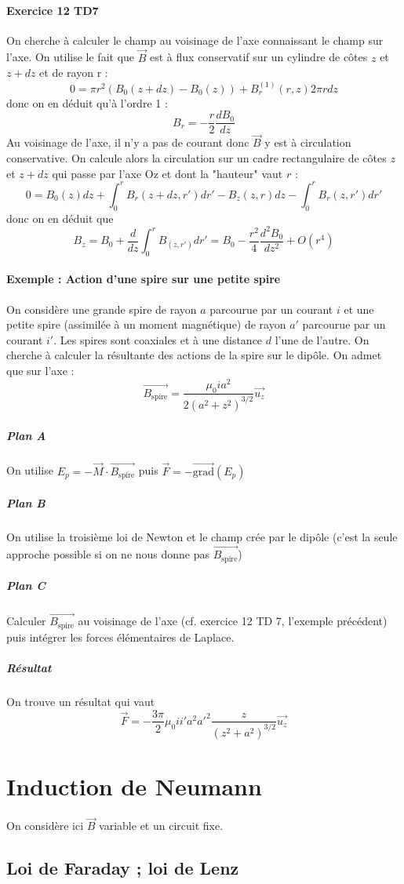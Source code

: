 \documentclass[french]{book}
\theoremstyle{plain}
\theoremstyle{definition}
\theoremstyle{remark}
\newcommand{\grad}{\overrightarrow{\text{grad}}}
\begin{document}
\paragraph{Exercice 12 TD7} On cherche à calculer le champ au voisinage de l'axe connaissant le champ sur l'axe. On utilise le fait que $\overrightarrow{B}$ est à flux conservatif sur un cylindre de côtes $z$ et $z+dz$ et de rayon r : $$0=\pi r^2\left(B_0(z+dz)-B_0(z)\right)+B_r^{(1)}(r,z)2\pi r dz$$ donc on en déduit qu'à l'ordre 1 : $$B_r=-\frac{r}{2}\frac{dB_0}{dz}$$ Au voisinage de l'axe, il n'y a pas de courant donc $\overrightarrow{B}$ y est à circulation conservative. On calcule alors la circulation sur un cadre rectangulaire de côtes $z$ et $z+dz$ qui passe par l'axe Oz et dont la "hauteur" vaut $r$ : $$0=B_0(z)dz+\int_{0}^{r}B_r(z+dz,r')dr'-B_z(z,r)dz-\int_{0}^{r}B_r(z,r')dr'$$ donc on en déduit que $$B_z=B_0+\frac{d}{dz}\int_{0}^{r}B_(z,r')dr'=B_0-\frac{r^2}{4}\frac{d^2B_0}{dz^2}+O(r^4)$$
\paragraph{Exemple : Action d'une spire sur une petite spire}On considère une grande spire de rayon $a$ parcourue par un courant $i$ et une petite spire (assimilée à un moment magnétique) de rayon $a'$ parcourue par un courant $i'$. Les spires sont coaxiales et à une distance $d$ l'une de l'autre. On cherche à calculer la résultante des actions de la spire sur le dipôle. On admet que sur l'axe : $$\overrightarrow{B_{\text{spire}}}=\frac{\mu_0 ia^2}{2(a^2+z^2)^{3/2}}\overrightarrow{u_z}$$
\subparagraph{Plan A} On utilise $E_p=-\overrightarrow{M}\cdot\overrightarrow{B_\text{spire}}$ puis $\overrightarrow{F}=-\grad(E_p)$
\subparagraph{Plan B} On utilise la troisième loi de Newton et le champ crée par le dipôle (c'est la seule approche possible si on ne nous donne pas $\overrightarrow{B_\text{spire}}$)
\subparagraph{Plan C} Calculer $\overrightarrow{B_\text{spire}}$ au voisinage de l'axe (cf. exercice 12 TD 7, l'exemple précédent) puis intégrer les forces élémentaires de Laplace.
\subparagraph{Résultat} On trouve un résultat qui vaut $$\overrightarrow{F}=-\frac{3\pi}{2}\mu_0 ii'a^2a'^2\frac{z}{(z^2+a^2)^{3/2}}\overrightarrow{u_z}$$
\section{Induction de Neumann}
On considère ici $\overrightarrow{B}$ variable et un circuit fixe.
\subsection{Loi de Faraday ; loi de Lenz}
\end{document}
